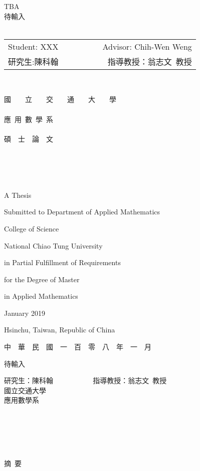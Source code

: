 \documentclass[12pt]{report}%
\renewcommand{\baselinestretch}{1.5} %
\theoremstyle{plain}
\theoremstyle{definition}
\begin{document}
\renewcommand{\baselinestretch}{2} %
\thispagestyle{empty}
\begin{center}
{
\Large
TBA\\
待輸入 \\~\\
\begin{tabular}{lccr}
Student: XXX  &&~~~& Advisor: Chih-Wen Weng\\
研究生:陳科翰　 &&~~~& 指導教授：翁志文~教授
\end{tabular}
}~\\

\bigskip

\renewcommand{\baselinestretch}{1} %

{ \LARGE 國~~~~立~~~~交~~~~通~~~~大~~~~學}\\~\\
{ \LARGE 應~用~數~學~系}\\~\\
{ \LARGE 碩~~士~~論~~文}\\~\\~\\~\\~\\
\renewcommand{\baselinestretch}{1} %
{ \large A Thesis

Submitted to Department of Applied Mathematics

College of Science

National Chiao Tung University

in Partial Fulfillment of Requirements

for the Degree of Master

in Applied Mathematics
\bigskip \medskip

January 2019

Hsinchu, Taiwan, Republic of China \bigskip \medskip

 中~~華~~民~~國~~一~~百~~零~~八~~年~~一~~月 }
\end{center}
\pagebreak
\begin{center}
{  \LARGE
待輸入
\bigskip\bigskip\bigskip

研究生：陳科翰  ~~~~~~~~~~ 指導教授：翁志文~教授 \\
國立交通大學  \\
\bigskip
應用數學系
\bigskip\bigskip\bigskip\bigskip
} \\~\\~\\~\\
{\large 摘~要}
\end{center}
 \bigskip
\end{document}
